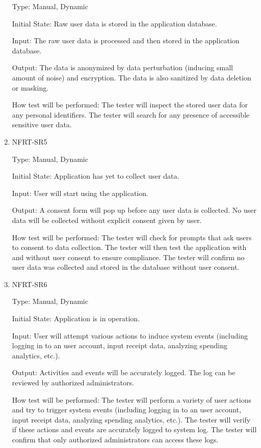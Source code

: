 \documentclass[12pt, titlepage]{article}
\begin{document}
\begin{enumerate}
Type: Manual, Dynamic

Initial State: Raw user data is stored in the application database.
                
Input: The raw user data is processed and then stored in the application database.
                
Output: The data is anonymized by data perturbation (inducing small amount of noise) and encryption. The data is also sanitized by data deletion or masking.
                
How test will be performed: The tester will inspect the stored user data for any personal identifiers. The tester will search for any presence of accessible sensitive user data.

\item{NFRT-SR5\\}

Type: Manual, Dynamic

Initial State: Application has yet to collect user data.
                
Input: User will start using the application.
                
Output: A consent form will pop up before any user data is collected. No user data will be collected without explicit consent given by user.
                
How test will be performed: The tester will check for prompts that ask users to consent to data collection. The tester will then test the application with and without user consent to ensure compliance. The tester will confirm no user data was collected and stored in the database without user consent.

\item{NFRT-SR6\\}

Type: Manual, Dynamic

Initial State: Application is in operation.
                
Input: User will attempt various actions to induce system events (including logging in to an user account, input receipt data, analyzing spending analytics, etc.).
                
Output: Activities and events will be accurately logged. The log can be reviewed by authorized administrators.
                
How test will be performed: The tester will perform a variety of user actions and try to trigger system events (including logging in to an user account, input receipt data, analyzing spending analytics, etc.). The tester will verify if these actions and events are accurately logged to system log. The tester will confirm that only authorized administrators can access these logs.

\end{enumerate}
\end{document}
